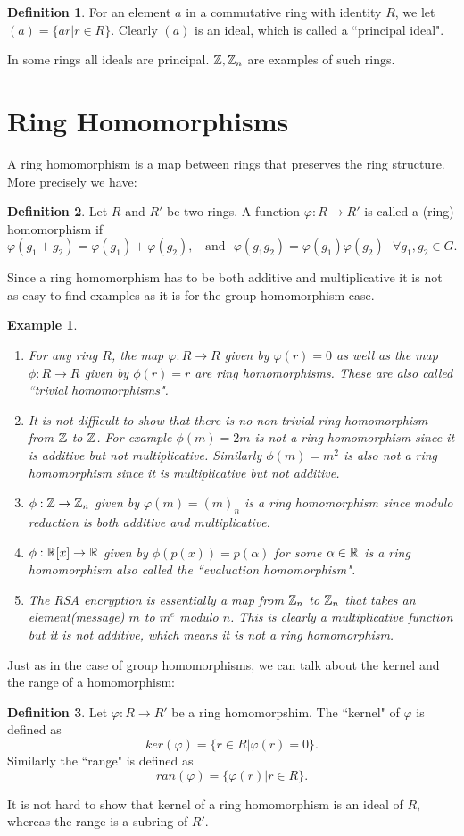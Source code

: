 \documentclass[12pt]{article}
\theoremstyle{plain}
\newtheorem{example}{Example}
\theoremstyle{definition}
\newtheorem{definition}{Definition}
\theoremstyle{remark}
\begin{document}
\begin{definition}
For an element $a$ in a commutative ring with identity $R$, we let 
$(a) = \{ar|r\in R\}$. Clearly $(a)$ is an ideal, which is called a ``principal ideal". 
\end{definition}
In some rings all ideals are principal. $\mathbb{Z}, \mathbb{Z}_n$ are examples of such rings. 
\section{Ring Homomorphisms}
A ring homomorphism is a map between rings that preserves the ring structure. More precisely we have:
\begin{definition}
Let $R$ and $R'$ be two rings. A function $\varphi:R\rightarrow R'$ is called a (ring) homomorphism if 
$$\varphi(g_1+g_2) = \varphi(g_1)+\varphi(g_2), \:\:\:\:\textrm{and}\:\:\: \varphi(g_1g_2) = \varphi(g_1)\varphi(g_2) \:\:\: \forall g_1, g_2 \in G.$$
\end{definition}
Since a ring homomorphism has to be both additive and multiplicative it is not as easy to find examples as it is for the group homomorphism case.
\begin{example}
\begin{enumerate}
    \item For any ring $R$, the map $\varphi:R \rightarrow R$ given by $\varphi(r)=0$ as well as the map $\phi:R \rightarrow R$ given by $\phi(r)=r$ are ring homomorphisms. These are also called ``trivial homomorphisms".
    \item It is not difficult to show that there is no non-trivial ring homomorphism from $\mathbb{Z}$ to $\mathbb{Z}$. For example $\phi(m)=2m$ is not a ring homomorphism since it is additive but not multiplicative. Similarly $\phi(m)=m^2$ is also not a ring homomorphism since it is multiplicative but not additive. 
    \item $\phi:\mathbb{Z} \rightarrow \mathbb{Z}_n$ given by $\varphi(m)=(m)_n$ is a ring homomorphism since modulo reduction is both additive and multiplicative. 
    \item $\phi:\mathbb{R}[x]\rightarrow \mathbb{R}$ given by $\phi(p(x)) = p(\alpha)$ for some $\alpha \in \mathbb{R}$ is a ring homomorphism also called the ``evaluation homomorphism".
   \item The RSA encryption is essentially a map from $\mathbb{Z}_n$ to $\mathbb{Z}_n$ that takes an element(message) $m$ to $m^e$ modulo $n$. This is clearly a multiplicative function but it is not additive, which means it is not a ring homomorphism. 
\end{enumerate}
\end{example}
Just as in the case of group homomorphisms, we can talk about the kernel and the range of a homomorphism:
\begin{definition}
Let $\varphi:R\rightarrow R'$ be a ring homomorpshim. The ``kernel" of $\varphi$ is defined as
$$ker(\varphi) = \{r\in R|\varphi(r)=0\}.$$
Similarly the ``range" is defined as 
$$ran(\varphi) = \{\varphi(r)|r\in R\}.$$
\end{definition}
It is not hard to show that kernel of a ring homomorphism is an ideal of $R$, whereas the range is a subring of $R'$.
\end{document}
